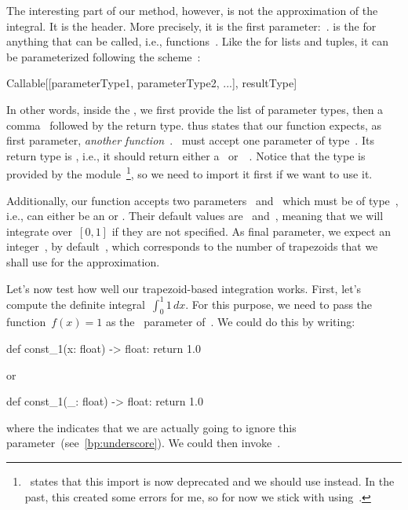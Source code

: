 The interesting part of our  method, however, is not the approximation of the integral.
It is the header.
More precisely, it is the first parameter:~.
 is the  for anything that can be called, i.e., functions~\cite{PSF2024ACO}.
Like the  for lists and tuples, it can be parameterized following the scheme~\cite{PEP612}:%
%
\begin{pythonSyntax}
Callable[[parameterType1, parameterType2, ...], resultType]
\end{pythonSyntax}
%
In other words, inside the , we first provide the list of parameter types, then a comma~\pythonil{,} followed by the return type.
 thus states that our function expects, as first parameter, \emph{another function}~.
~must accept one parameter of type~.
Its return type is , i.e., it should return either a~ or~~\cite{PEP604}.
Notice that the type  is provided by the module~\footnote{%
\cite{PSF2024ACO}~states that this import is now deprecated and we should use  instead. %
In the past, this created some errors for me, so for now we stick with using~.}, %
so we need to import it first if we want to use it.%
%
\begin{sloppypar}%
Additionally, our  function accepts two parameters~ and~ which must be of type~, i.e., can either be an  or .
Their default values are~ and~, meaning that we will integrate over~$[0,1]$ if they are not specified.
As final parameter, we expect an integer~, by default~, which corresponds to the number of trapezoids that we shall use for the approximation.%
\end{sloppypar}%
%
Let's now test how well our trapezoid-based integration works.
First, let's compute the definite integral~$\int_0^1 1\,dx$.
For this purpose, we need to pass the function~$f(x)=1$ as the~ parameter of~.
We could do this by writing:%
%
\begin{pythonSyntax}
def const_1(x: float) -> float:
    return 1.0
\end{pythonSyntax}
%
or%
%
\begin{pythonSyntax}
def const_1(_: float) -> float:
    return 1.0
\end{pythonSyntax}
%
where the \pythonil{_}\pythonIdx{\_} indicates that we are actually going to ignore this parameter~(see~\cref{bp:underscore}).
We could then invoke~.

